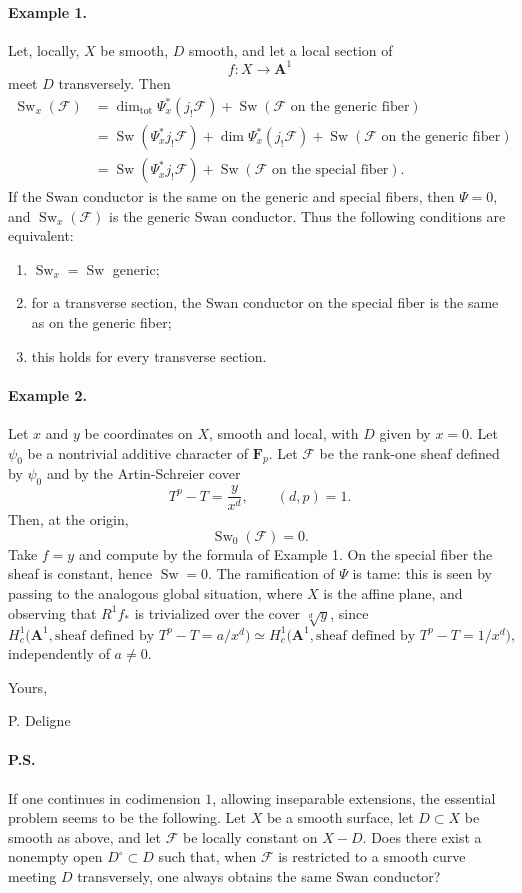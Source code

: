 \documentclass[11pt]{article}
\newcommand{\F}{\mathcal F}
\newcommand{\Fp}{\mathbf F_p}
\newcommand{\A}{\mathbf A}
\DeclareMathOperator{\Sw}{Sw}
\DeclareMathOperator{\Tot}{tot}
\begin{document}
\paragraph{Example 1.}
Let, locally, \(X\) be smooth, \(D\) smooth, and let a local section of
\[
  f:X\longrightarrow \A^1
\]
meet \(D\) transversely. Then
\[
\begin{aligned}
\Sw_x(\F)
&=\dim_{\Tot}\Psi_x^*(j_!\F)
  +\Sw(\F\text{ on the generic fiber}) \\
&=\Sw(\Psi_x^*j_!\F)
  +\dim\Psi_x^*(j_!\F)
  +\Sw(\F\text{ on the generic fiber}) \\
&=\Sw(\Psi_x^*j_!\F)+\Sw(\F\text{ on the special fiber}).
\end{aligned}
\]
If the Swan conductor is the same on the generic and special fibers, then \(\Psi=0\), and \(\Sw_x(\F)\) is the generic Swan conductor. Thus the following conditions are equivalent:
\begin{enumerate}[label=(\roman*)]
\item \(\Sw_x=\Sw\) generic;
\item for a transverse section, the Swan conductor on the special fiber is the same as on the generic fiber;
\item this holds for every transverse section.
\end{enumerate}

\paragraph{Example 2.}
Let \(x\) and \(y\) be coordinates on \(X\), smooth and local, with \(D\) given by \(x=0\). Let \(\psi_0\) be a nontrivial additive character of \(\Fp\). Let \(\F\) be the rank-one sheaf defined by \(\psi_0\) and by the Artin-Schreier cover
\[
  T^p-T=\frac{y}{x^d},
  \qquad (d,p)=1.
\]
Then, at the origin,
\[
  \Sw_0(\F)=0.
\]
Take \(f=y\) and compute by the formula of Example 1. On the special fiber the sheaf is constant, hence \(\Sw=0\). The ramification of \(\Psi\) is tame: this is seen by passing to the analogous global situation, where \(X\) is the affine plane, and observing that \(R^1f_*\) is trivialized over the cover \(\sqrt[d]{y}\), since
\[
 H_c^1\bigl(\A^1,\text{sheaf defined by }T^p-T=a/x^d\bigr)
 \simeq
 H_c^1\bigl(\A^1,\text{sheaf defined by }T^p-T=1/x^d\bigr),
\]
independently of \(a\ne 0\).

Yours,

\hspace{2em}P. Deligne

\paragraph{P.S.}
If one continues in codimension \(1\), allowing inseparable extensions, the essential problem seems to be the following. Let \(X\) be a smooth surface, let \(D\subset X\) be smooth as above, and let \(\F\) be locally constant on \(X-D\). Does there exist a nonempty open \(D^\circ\subset D\) such that, when \(\F\) is restricted to a smooth curve meeting \(D\) transversely, one always obtains the same Swan conductor?
\end{document}

